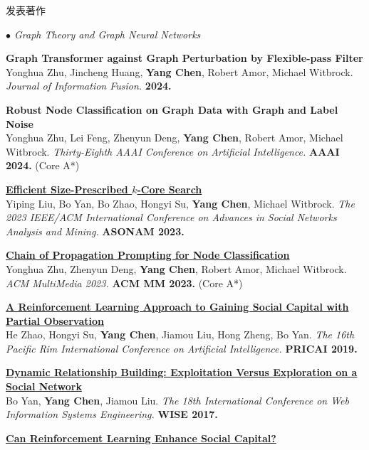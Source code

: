 \documentclass{resume} %
\begin{document}
\begin{rSection}{发表著作}
\begin{rSubsection}{\large\em $\bullet$ Graph Theory and Graph Neural Networks}{}{}{}
	\item {\bf Graph Transformer against Graph Perturbation by Flexible-pass Filter}\\
		Yonghua Zhu, Jincheng Huang, \textbf{Yang Chen}, Robert Amor, Michael Witbrock. {\em Journal of Information Fusion.} {\bf 2024.}\\
	\item {\bf Robust Node Classification on Graph Data with Graph and Label Noise}\\
		Yonghua Zhu, Lei Feng, Zhenyun Deng, \textbf{Yang Chen}, Robert Amor, Michael Witbrock. {\em Thirty-Eighth AAAI Conference on Artificial Intelligence.} \textbf{AAAI 2024.} (Core A*)\\
	\item {\href{}{\bf Efficient Size-Prescribed $k$-Core Search}}\\
		Yiping Liu, Bo Yan, Bo Zhao, Hongyi Su, \textbf{Yang Chen}, Michael Witbrock. {\em The 2023 IEEE/ACM International Conference on Advances in Social Networks Analysis and Mining.} \textbf{ASONAM 2023.}\\
	\item{
	\href{}{\bf Chain of Propagation Prompting for Node Classification}}\\
	Yonghua Zhu, Zhenyun Deng, \textbf{Yang Chen}, Robert Amor, Michael Witbrock. {\em ACM MultiMedia 2023.} \textbf{ACM MM 2023.} (Core A*)\\
	\item {\href{https://link.springer.com/chapter/10.1007/978-3-030-29908-8_9}{\bf A Reinforcement Learning Approach to Gaining Social Capital with Partial Observation}}\\
		He Zhao, Hongyi Su, \textbf{Yang Chen}, Jiamou Liu, Hong Zheng, Bo Yan. {\em The 16th Pacific Rim International Conference on Artificial Intelligence.} \textbf{PRICAI 2019.} \\
	\item {\href{https://github.com/PolynomialTime/WISE2017/blob/master/WISE2017.pdf}{\bf Dynamic Relationship Building: Exploitation Versus Exploration on a Social Network}}\\
		Bo Yan, \textbf{Yang Chen}, Jiamou Liu. {\em The 18th International Conference on Web Information Systems Engineering.} \textbf{WISE 2017.}\\
	\item {\href{https://link.springer.com/chapter/10.1007/978-981-15-3281-8_14}{\bf Can Reinforcement Learning Enhance Social Capital?}}\\

\end{rSubsection}
\end{rSection}
\end{document}
